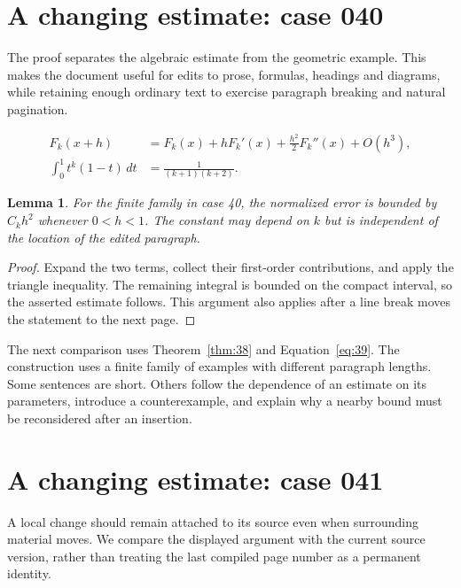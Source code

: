\documentclass[a4paper,10pt]{article}
\newtheorem{lemma}[theorem]{Lemma}
\begin{document}
\lipsum[18]

\section{A changing estimate: case 040}\label{unit:39}
The proof separates the algebraic estimate from the geometric example. This makes the document useful for edits to prose, formulas, headings and diagrams, while retaining enough ordinary text to exercise paragraph breaking and natural pagination.

\lipsum[28-29]
\begin{align}\label{eq:39}
 F_k(x+h)&=F_k(x)+hF_k'(x)+\frac{h^2}{2}F_k''(x)+O(h^3),\\
 \int_0^1 t^k(1-t)\,dt&=\frac{1}{(k+1)(k+2)}.
\end{align}
\begin{lemma}\label{thm:39}
For the finite family in case 40, the normalized error is bounded by $C_k h^2$ whenever $0<h<1$. The constant may depend on $k$ but is independent of the location of the edited paragraph.
\end{lemma}
\begin{proof}
Expand the two terms, collect their first-order contributions, and apply the
triangle inequality. The remaining integral is bounded on the compact interval,
so the asserted estimate follows. This argument also applies after a line break
moves the statement to the next page.
\end{proof}
\begin{center}
\end{center}
The next comparison uses Theorem~\ref{thm:38} and Equation~\ref{eq:39}. The construction uses a finite family of examples with different paragraph lengths. Some sentences are short. Others follow the dependence of an estimate on its parameters, introduce a counterexample, and explain why a nearby bound must be reconsidered after an insertion.

\lipsum[23]

\section{A changing estimate: case 041}\label{unit:40}
A local change should remain attached to its source even when surrounding material moves. We compare the displayed argument with the current source version, rather than treating the last compiled page number as a permanent identity.
\end{document}
